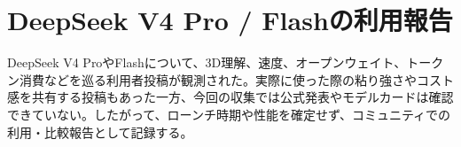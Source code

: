 \section{DeepSeek V4 Pro / Flashの利用報告}
DeepSeek V4 ProやFlashについて、3D理解、速度、オープンウェイト、トークン消費などを巡る利用者投稿が観測された。実際に使った際の粘り強さやコスト感を共有する投稿もあった一方、今回の収集では公式発表やモデルカードは確認できていない。したがって、ローンチ時期や性能を確定せず、コミュニティでの利用・比較報告として記録する。
